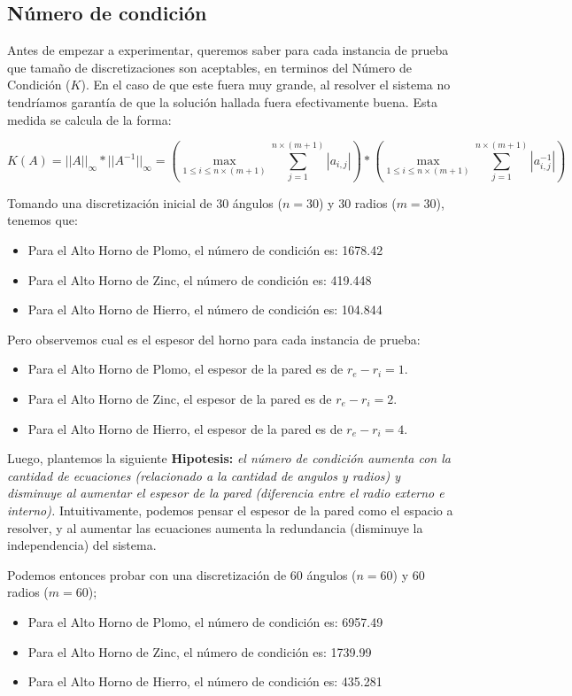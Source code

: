 \subsection{Número de condición}

Antes de empezar a experimentar, queremos saber para cada instancia de prueba que tamaño de discretizaciones son aceptables, en terminos del Número de Condición ($K$).
En el caso de que este fuera muy grande, al resolver el sistema no tendríamos garantía de que la solución hallada fuera efectivamente buena. Esta medida se calcula de la forma:

$$K(A) = ||A||_{\infty} * ||A^{-1}||_{\infty} = \left( \max\limits_{1\leq i \leq n\times(m+1)}\sum_{j=1}^{n\times(m+1)}{|a_{i,j}|} \right) * \left( \max\limits_{1\leq i \leq n\times(m+1)}\sum_{j=1}^{n\times(m+1)}{|a_{i,j}^{-1}|} \right)$$

Tomando una discretización inicial de 30 ángulos ($n = 30$) y 30 radios ($m = 30$), tenemos que:
\begin{itemize}
    \item Para el Alto Horno de Plomo, el número de condición es: 1678.42
    \item Para el Alto Horno de Zinc, el número de condición es: 419.448
    \item Para el Alto Horno de Hierro, el número de condición es: 104.844
\end{itemize}

Pero observemos cual es el espesor del horno para cada instancia de prueba:
\begin{itemize}
    \item Para el Alto Horno de Plomo, el espesor de la pared es de $r_e - r_i = 1$.
    \item Para el Alto Horno de Zinc, el espesor de la pared es de $r_e - r_i = 2$.
    \item Para el Alto Horno de Hierro, el espesor de la pared es de $r_e - r_i = 4$.
\end{itemize}

Luego, plantemos la siguiente \textbf{Hipotesis:} \textit{el número de condición
aumenta con la cantidad de ecuaciones (relacionado a la cantidad de angulos y
radios) y disminuye al aumentar el espesor de la pared (diferencia entre el
radio externo e interno).} Intuitivamente, podemos pensar el espesor de la pared
como el espacio a resolver, y al aumentar las ecuaciones aumenta la redundancia
(disminuye la independencia) del sistema.

Podemos entonces probar con una discretización de 60 ángulos ($n = 60$) y 60 radios ($m = 60$);
\begin{itemize}
    \item Para el Alto Horno de Plomo, el número de condición es: 6957.49
    \item Para el Alto Horno de Zinc, el número de condición es: 1739.99
    \item Para el Alto Horno de Hierro, el número de condición es: 435.281
\end{itemize}

